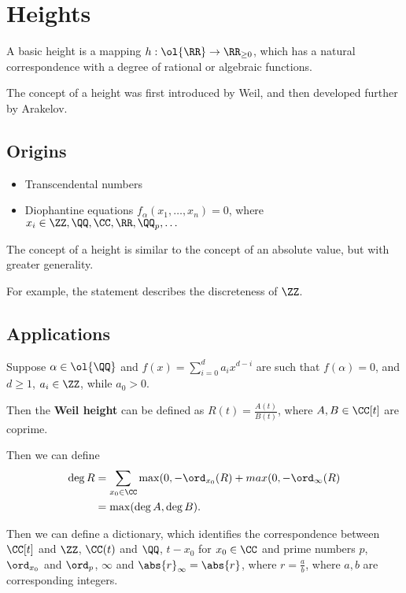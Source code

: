 \documentclass[11pt]{scrartcl}
\begin{document}
\section{Heights}

\begin{definition}
  A basic height is a mapping $h: \ol{\RR} \to \RR_{\geq 0}$, which
  has a natural correspondence with a degree of rational or algebraic
  functions.
\end{definition}

The concept of a height was first introduced by Weil, and then
developed further by Arakelov.

\subsection{Origins}

\begin{itemize}
\item Transcendental numbers
\item Diophantine equations $f_{\alpha}(x_1, \dots, x_n) = 0$, where $x_i\in\ZZ, \QQ, \CC,\RR,\QQ_p, \dots$
\end{itemize}

The concept of a height is similar to the concept of an absolute
value, but with greater generality.

For example, the statement  describes the discreteness of $\ZZ$.

\subsection{Applications}

Suppose $\alpha \in \ol{\QQ}$ and $f(x) = \sum_{i=0}^d a_ix^{d-i}$ are
such that $f(\alpha) = 0$, and $d\geq 1$, $a_i\in\ZZ$, while
$a_0 > 0$.

Then the \textbf{Weil height} can be defined as
$R(t) = \frac{A(t)}{B(t)}$, where $A, B \in \CC[t]$ are coprime.

Then we can define
\begin{align}
  \deg R & = \sum_{x_0\in\CC} \max(0, -\ord_{x_0}(R) +
           max(0, -\ord_{\infty}(R) \\
         & = \max(\deg A, \deg B).
\end{align}

Then we can define a dictionary, which identifies the correspondence
between $\CC[t]$ and $\ZZ$, $\CC(t)$ and $\QQ$, $t-x_0$ for
$x_0\in\CC$ and prime numbers $p$, $\ord_{x_0}$ and $\ord_p$, $\infty$
and $\abs{r}_{\infty} = \abs{r}$, where $r = \frac{a}{b}$, where
$a, b$ are corresponding integers.
\end{document}
